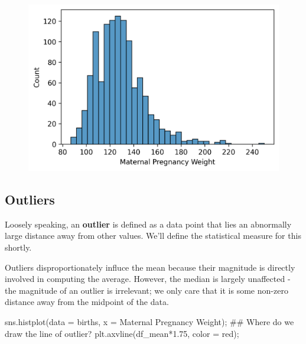 \documentclass[
  letterpaper,
  DIV=11,
  numbers=noendperiod]{scrreprt}
\newenvironment{Shaded}{\begin{snugshade}}{\end{snugshade}}
\newcommand{\CommentTok}[1]{\textcolor[rgb]{0.37,0.37,0.37}{#1}}
\newcommand{\FloatTok}[1]{\textcolor[rgb]{0.68,0.00,0.00}{#1}}
\newcommand{\NormalTok}[1]{\textcolor[rgb]{0.00,0.23,0.31}{#1}}
\newcommand{\OperatorTok}[1]{\textcolor[rgb]{0.37,0.37,0.37}{#1}}
\newcommand{\StringTok}[1]{\textcolor[rgb]{0.13,0.47,0.30}{#1}}
\begin{document}
\begin{figure}[H]

{\centering \includegraphics{visualization_1/visualization_1_files/figure-pdf/cell-11-output-2.png}

}

\end{figure}

\hypertarget{outliers}{%
\subsection{Outliers}\label{outliers}}

Loosely speaking, an \textbf{outlier} is defined as a data point that
lies an abnormally large distance away from other values. We'll define
the statistical measure for this shortly.

Outliers disproportionately influce the mean because their magnitude is
directly involved in computing the average. However, the median is
largely unaffected - the magnitude of an outlier is irrelevant; we only
care that it is some non-zero distance away from the midpoint of the
data.

\begin{Shaded}
\begin{Highlighting}[]
\NormalTok{sns.histplot(data }\OperatorTok{=}\NormalTok{ births, x }\OperatorTok{=} \StringTok{\textquotesingle{}Maternal Pregnancy Weight\textquotesingle{}}\NormalTok{)}\OperatorTok{;}
\CommentTok{\#\# Where do we draw the line of outlier? }
\NormalTok{plt.axvline(df\_mean}\OperatorTok{*}\FloatTok{1.75}\NormalTok{, color }\OperatorTok{=} \StringTok{\textquotesingle{}red\textquotesingle{}}\NormalTok{)}\OperatorTok{;}
\end{Highlighting}
\end{Shaded}
\end{document}
